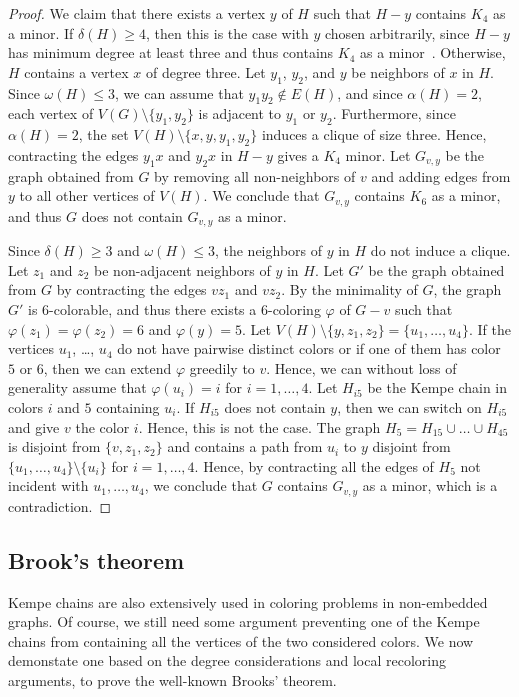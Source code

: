\documentclass[12pt,twoside,openright,a4paper]{book}
\begin{document}
\begin{proof}
We claim that there exists a vertex $y$ of $H$ such that $H-y$ contains $K_4$ as a minor.
If $\delta(H)\ge 4$, then this is the case with $y$ chosen arbitrarily, since $H-y$ has minimum degree at least three and thus contains $K_4$ as a minor~\cite{dirac}.
Otherwise, $H$ contains a vertex $x$ of degree three.  Let $y_1$, $y_2$, and $y$ be neighbors of $x$ in $H$.  Since $\omega(H)\le 3$, we can assume
that $y_1y_2\not\in E(H)$, and since $\alpha(H)=2$, each vertex of $V(G)\setminus\{y_1,y_2\}$ is adjacent to $y_1$ or $y_2$.
Furthermore, since $\alpha(H)=2$, the set $V(H)\setminus\{x,y,y_1,y_2\}$ induces a clique of size three.  Hence, contracting the edges $y_1x$ and $y_2x$ in $H-y$ gives
a $K_4$ minor.  Let $G_{v,y}$ be the graph obtained from $G$ by removing all non-neighbors of $v$ and adding edges from $y$ to all other vertices of $V(H)$.
We conclude that $G_{v,y}$ contains $K_6$ as a minor, and thus $G$ does not contain $G_{v,y}$ as a minor.

Since $\delta(H)\ge 3$ and $\omega(H)\le 3$, the neighbors of $y$ in $H$ do not induce a clique.  Let $z_1$ and $z_2$ be non-adjacent neighbors of $y$ in $H$.
Let $G'$ be the graph obtained from $G$ by contracting the edges $vz_1$ and $vz_2$.  By the minimality of $G$, the graph $G'$ is $6$-colorable,
and thus there exists a $6$-coloring $\varphi$ of $G-v$ such that $\varphi(z_1)=\varphi(z_2)=6$ and $\varphi(y)=5$.  Let $V(H)\setminus\{y,z_1,z_2\}=\{u_1,\ldots,u_4\}$.
If the vertices $u_1$, \ldots, $u_4$ do not have pairwise distinct colors or if one of them has color $5$ or $6$, then we can extend $\varphi$ greedily to $v$.
Hence, we can without loss of generality assume that $\varphi(u_i)=i$ for $i=1, \ldots, 4$.  Let $H_{i5}$ be the Kempe chain in colors $i$ and $5$ containing $u_i$.
If $H_{i5}$ does not contain $y$, then we can switch on $H_{i5}$ and give $v$ the color $i$.  Hence, this is not the case.
The graph $H_5=H_{15}\cup\ldots\cup H_{45}$ is disjoint from $\{v,z_1,z_2\}$ and contains a path from $u_i$ to $y$ disjoint from $\{u_1,\ldots,u_4\}\setminus \{u_i\}$
for $i=1, \ldots, 4$.  Hence, by contracting all the edges of $H_5$ not incident with $u_1, \ldots, u_4$, we conclude that $G$ contains $G_{v,y}$ as a minor,
which is a contradiction.
\end{proof}

\subsection{Brook's theorem}

Kempe chains are also extensively used in coloring problems in non-embedded graphs.
Of course, we still need some argument preventing one of the Kempe chains from containing
all the vertices of the two considered colors.  We now demonstate one based on the
degree considerations and local recoloring arguments, to prove the well-known Brooks' theorem.
\end{document}
